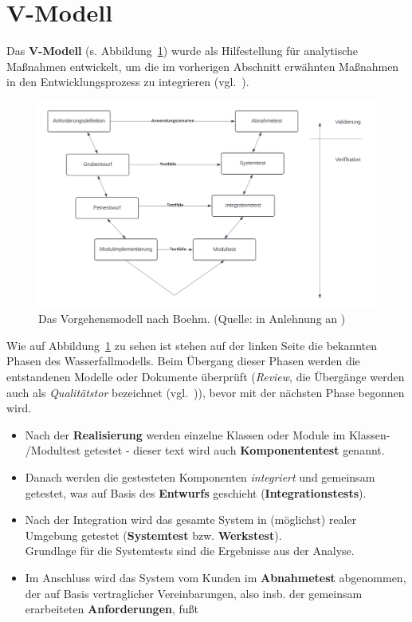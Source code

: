 \section{V-Modell}
Das \textbf{V-Modell} (s. Abbildung~\ref{fig:v-modell}) wurde als Hilfestellung für analytische Maßnahmen entwickelt, um die im vorherigen Abschnitt erwähnten Maßnahmen in den Entwicklungsprozess zu integrieren (vgl.~\cite[10]{Wed09c}).

\begin{figure}
    \centering
    \includegraphics[scale=0.3]{chapters/Glossar/img/vmodell}
    \caption{Das Vorgehensmodell nach Boehm. (Quelle: in Anlehnung an \cite[554, Abb. 20.11-2]{Bal08})}
    \label{fig:v-modell}
\end{figure}

\noindent
Wie auf Abbildung~\ref{fig:v-modell} zu sehen ist stehen auf der linken Seite die bekannten Phasen des Wasserfallmodells.
Beim Übergang dieser Phasen werden die entstandenen Modelle oder Dokumente überprüft (\textit{Review}, die Übergänge werden auch als \textit{Qualitätstor} bezeichnet (vgl.~\cite[11]{Wed09c})), bevor mit der nächsten Phase begonnen wird.

\begin{itemize}
    \item Nach der \textbf{Realisierung} werden einzelne Klassen oder Module im Klassen- /Modultest getestet - dieser text wird auch \textbf{Komponententest} genannt.
    \item Danach werden die gestesteten Komponenten \textit{integriert} und gemeinsam getestet, was auf Basis des \textbf{Entwurfs} geschieht (\textbf{Integrationstests}).
    \item Nach der Integration wird das gesamte System in (möglichst) realer Umgebung getestet (\textbf{Systemtest} bzw. \textbf{Werkstest}).\\
    Grundlage für die Systemtests sind die Ergebnisse aus der Analyse.
    \item Im Anschluss wird das System  vom Kunden im \textbf{Abnahmetest} abgenommen, der auf Basis vertraglicher Vereinbarungen, also insb. der gemeinsam erarbeiteten \textbf{Anforderungen}, fußt
\end{itemize}

